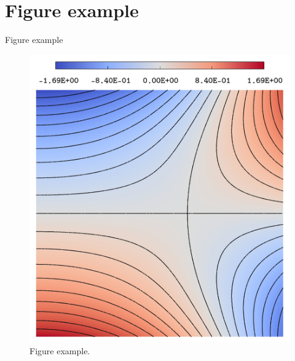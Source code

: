 \section{Figure example}
\begin{frame}{Figure example}
\begin{figure}[H]
\centering
\includegraphics[width=.5\textwidth]{fig/beam_solx.jpg}
\caption{Figure example.}
\end{figure}
\end{frame}
